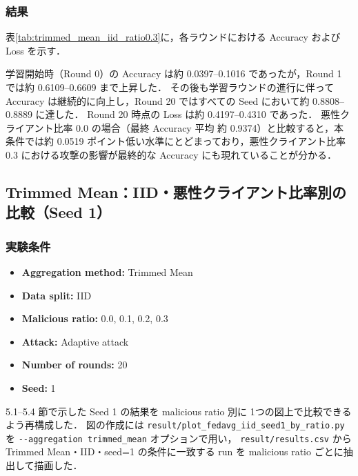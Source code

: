 \documentclass[a4j,twocolumn,dvipdfmx]{jsarticle}
\begin{document}
\subsubsection{結果}

表\ref{tab:trimmed_mean_iid_ratio0.3}に，各ラウンドにおける
Accuracy および Loss を示す．

学習開始時（Round 0）の Accuracy は約 0.0397--0.1016 であったが，Round 1 では約 0.6109--0.6609 まで上昇した． その後も学習ラウンドの進行に伴って Accuracy は継続的に向上し，Round 20 ではすべての Seed において約 0.8808--0.8889 に達した． Round 20 時点の Loss は約 0.4197--0.4310 であった． 悪性クライアント比率 0.0 の場合（最終 Accuracy 平均 約 0.9374）と比較すると，本条件では約 0.0519 ポイント低い水準にとどまっており，悪性クライアント比率 0.3 における攻撃の影響が最終的な Accuracy にも現れていることが分かる．

\clearpage
\subsection{Trimmed Mean：IID・悪性クライアント比率別の比較（Seed 1）}

\subsubsection{実験条件}

\begin{itemize}
    \item \textbf{Aggregation method:} Trimmed Mean
    \item \textbf{Data split:} IID
    \item \textbf{Malicious ratio:} 0.0, 0.1, 0.2, 0.3
    \item \textbf{Attack:} Adaptive attack
    \item \textbf{Number of rounds:} 20
    \item \textbf{Seed:} 1
\end{itemize}

5.1--5.4 節で示した Seed 1 の結果を malicious ratio 別に
1つの図上で比較できるよう再構成した．
図の作成には \verb|result/plot_fedavg_iid_seed1_by_ratio.py| を
\verb|--aggregation trimmed_mean| オプションで用い，
\verb|result/results.csv| から Trimmed Mean・IID・seed=1 の条件に一致する
run を malicious ratio ごとに抽出して描画した．
\end{document}
